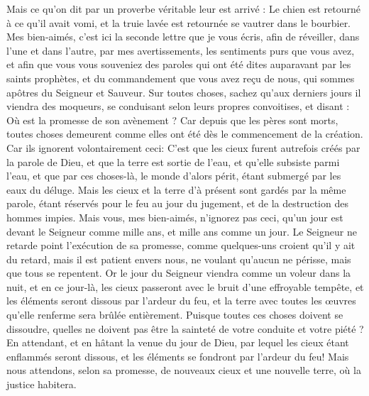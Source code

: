 \begin{multicols}{2}
Mais ce qu'on dit par un proverbe véritable leur est arrivé : Le chien est retourné à ce qu'il avait vomi, et la truie lavée est retournée se vautrer dans le bourbier.
\VerseOne{}Mes bien-aimés, c'est ici la seconde lettre que je vous écris, afin de réveiller, dans l'une et dans l'autre, par mes avertissements, les sentiments purs que vous avez,
et afin que vous vous souveniez des paroles qui ont été dites auparavant par les saints prophètes, et du commandement que vous avez reçu de nous, qui sommes apôtres du Seigneur et Sauveur.
Sur toutes choses, sachez qu'aux derniers jours il viendra des moqueurs, se conduisant selon leurs propres convoitises,
et disant : Où est la promesse de son avènement ? Car depuis que les pères sont morts, toutes choses demeurent comme elles ont été dès le commencement de la création.
Car ils ignorent volontairement ceci: C'est que les cieux furent autrefois créés par la parole de Dieu, et que la terre est sortie de l'eau, et qu'elle subsiste parmi l'eau,
et que par ces choses-là, le monde d'alors périt, étant submergé par les eaux du déluge.
Mais les cieux et la terre d'à présent sont gardés par la même parole, étant réservés pour le feu au jour du jugement, et de la destruction des hommes impies.
Mais vous, mes bien-aimés, n'ignorez pas ceci, qu'un jour est devant le Seigneur comme mille ans, et mille ans comme un jour.
Le Seigneur ne retarde point l'exécution de sa promesse, comme quelques-uns croient qu'il y ait du retard, mais il est patient envers nous, ne voulant qu'aucun ne périsse, mais que tous se repentent.
Or le jour du Seigneur viendra comme un voleur dans la nuit, et en ce jour-là, les cieux passeront avec le bruit d'une effroyable tempête, et les éléments seront dissous par l'ardeur du feu, et la terre avec toutes les œuvres qu'elle renferme sera brûlée entièrement.
Puisque toutes ces choses doivent se dissoudre, quelles ne doivent pas être la sainteté de votre conduite et votre piété ?
En attendant, et en hâtant la venue du jour de Dieu, par lequel les cieux étant enflammés seront dissous, et les éléments se fondront par l'ardeur du feu!
Mais nous attendons, selon sa promesse, de nouveaux cieux et une nouvelle terre, où la justice habitera.

\end{multicols}
